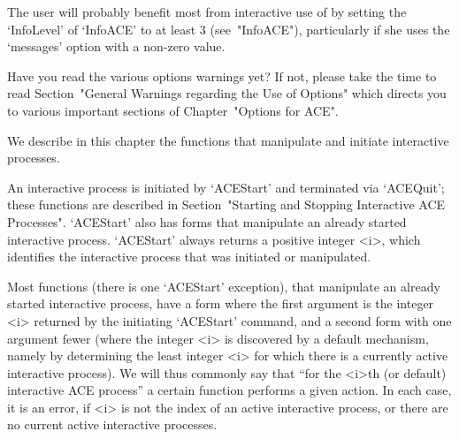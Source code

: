 

The user will probably benefit most from interactive use of {\ACE}  by
setting   the   `InfoLevel'   of   `InfoACE'    to    at    least    3
(see~"InfoACE"),  particularly  if  she  uses  the  `messages'
option with a non-zero value.

Have you read the various options warnings yet? If  not,  please  take
the time to  read  Section~"General  Warnings  regarding  the  Use  of
Options"  which  directs  you  to  various   important   sections   of
Chapter~"Options for ACE".

We describe in this chapter the functions that manipulate and initiate
interactive {\ACE} processes.

An  interactive  {\ACE}  process  is  initiated  by   `ACEStart'   and
terminated  via  `ACEQuit';   these   functions   are   described   in
Section~"Starting and Stopping Interactive ACE Processes".  `ACEStart'
also has forms that manipulate an already started  interactive  {\ACE}
process. `ACEStart' always  returns  a  positive  integer  <i>,  which
identifies the  interactive  {\ACE}  process  that  was  initiated  or
manipulated.

Most functions (there is one `ACEStart' exception), that manipulate an
already started interactive {\ACE} process,  have  a  form  where  the
first  argument  is  the  integer  <i>  returned  by  the   initiating
`ACEStart' command, and a second form with one argument  fewer  (where
the integer <i> is  discovered  by  a  default  mechanism,  namely  by
determining the least integer <i>  for  which  there  is  a  currently
active interactive {\ACE} process). We will  thus  commonly  say  that
``for the <i>th (or default) interactive  {ACE}  process''  a  certain
function performs a given action. In each case, it is an error, if <i>
is not the index of an active interactive process,  or  there  are  no
current active interactive processes.

